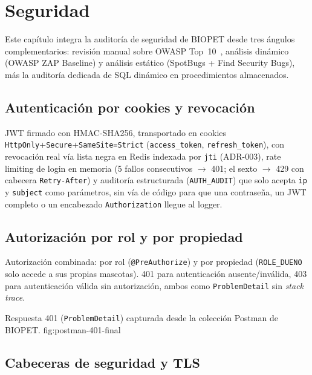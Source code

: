 \chapter{Seguridad}
\label{cap:seguridad}

Este cap\'itulo integra la auditor\'ia de seguridad de BIOPET desde tres
\'angulos complementarios: revisi\'on manual sobre OWASP Top~10~\cite{owasp-top10},
an\'alisis din\'amico (OWASP ZAP Baseline) y an\'alisis est\'atico
(SpotBugs + Find Security Bugs), m\'as la auditor\'ia dedicada de SQL
din\'amico en procedimientos almacenados.

\section{Autenticaci\'on por cookies y revocaci\'on}

JWT firmado con HMAC-SHA256, transportado en cookies
\texttt{HttpOnly}+\texttt{Secure}+\texttt{SameSite=Strict}
(\texttt{access\_token}, \texttt{refresh\_token}), con revocaci\'on real
v\'ia lista negra en Redis indexada por \texttt{jti} (ADR-003), rate
limiting de login en memoria (5 fallos consecutivos $\to$ 401; el sexto
$\to$ 429 con cabecera \texttt{Retry-After}) y auditor\'ia estructurada
(\texttt{AUTH\_AUDIT}) que solo acepta \texttt{ip} y \texttt{subject} como
par\'ametros, sin v\'ia de c\'odigo para que una contrase\~na, un JWT
completo o un encabezado \texttt{Authorization} llegue al logger.

\section{Autorizaci\'on por rol y por propiedad}

Autorizaci\'on combinada: por rol (\texttt{@PreAuthorize}) y por propiedad
(\texttt{ROLE\_DUENO} solo accede a sus propias mascotas). 401 para
autenticaci\'on ausente/inv\'alida, 403 para autenticaci\'on v\'alida sin
autorizaci\'on, ambos como \texttt{ProblemDetail} sin \emph{stack trace}.

%
{Respuesta 401 (\texttt{ProblemDetail}) capturada desde la colecci\'on Postman de BIOPET.}%
{fig:postman-401-final}

\section{Cabeceras de seguridad y TLS}


